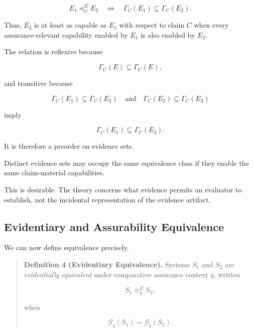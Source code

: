 \begin{equation}
  E_1
  \preceq_C^{E}
  E_2
  \quad\Longleftrightarrow\quad
  \Gamma_C(E_1)
  \subseteq
  \Gamma_C(E_2).
  \label{eq:evidence-preorder}
\end{equation}

Thus, \(E_2\) is at least as capable as \(E_1\) with respect to claim \(C\) when every assurance-relevant capability enabled by \(E_1\) is also enabled by \(E_2\).

The relation is reflexive because

\begin{equation}
  \Gamma_C(E)
  \subseteq
  \Gamma_C(E),
\end{equation}

and transitive because

\begin{equation}
  \Gamma_C(E_1)
  \subseteq
  \Gamma_C(E_2)
  \quad\text{and}\quad
  \Gamma_C(E_2)
  \subseteq
  \Gamma_C(E_3)
\end{equation}

imply

\begin{equation}
  \Gamma_C(E_1)
  \subseteq
  \Gamma_C(E_3).
\end{equation}

It is therefore a preorder on evidence sets.

Distinct evidence sets may occupy the same equivalence class if they enable the same claim-material capabilities.

This is desirable.
The theory concerns what evidence permits an evaluator to establish, not the incidental representation of the evidence artifact.

\subsection{Evidentiary and Assurability Equivalence}
\label{aa.subsec.evidentiary-equivalence}

We can now define equivalence precisely.

\begin{quote}
  \textbf{Definition 4 (Evidentiary Equivalence).}
  Systems \(S_1\) and \(S_2\) are \emph{evidentially equivalent} under comparative assurance context \(q\), written

  \begin{equation}
    S_1 \equiv_q^{E} S_2,
  \end{equation}

  when

  \begin{equation}
    \mathcal{G}_q(S_1)
    =
    \mathcal{G}_q(S_2).
    \label{eq:evidentiary-equivalence}
  \end{equation}
\end{quote}

